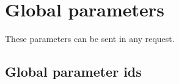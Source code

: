 %
% 
% 
% 
%

\section{Global parameters}

These parameters can be sent in any request.


\subsection{Global parameter ids}


